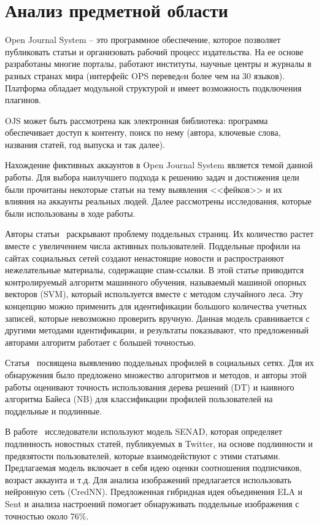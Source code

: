 \newpage
\section{Анализ предметной области}
\label{sec:Background}

Open Journal System – это программное обеспечение, которое позволяет публиковать статьи и организовать рабочий процесс издательства. На ее основе разработаны многие порталы, работают институты, научные центры и журналы в разных странах мира (интерфейс OPS переведeн более чем на 30 языков). Платформа обладает модульной структурой и имеет возможность подключения плагинов. 

OJS может быть рассмотрена как электронная библиотека: программа обеспечивает доступ к контенту, поиск по нему (автора, ключевые слова, названия статей, год выпуска и так далее). 

Нахождение фиктивных аккаунтов в Open Journal System является темой данной работы. Для выбора наилучшего подхода к решению задач и достижения цели были прочитаны некоторые статьи на тему выявления <<фейков>> и их влияния на аккаунты реальных людей. Далее рассмотрены исследования, которые были использованы в ходе работы.

Авторы статьи~\cite{HassanAA23} раскрывают проблему поддельных страниц. Их количество растет вместе с увеличением числа активных пользователей. Поддельные профили на сайтах социальных сетей создают ненастоящие новости и распространяют нежелательные материалы, содержащие спам-ссылки. В этой статье приводится контролируемый алгоритм машинного обучения, называемый машиной опорных векторов (SVM), который используется вместе с методом случайного леса. Эту концепцию можно применить для идентификации большого количества учетных записей, которые невозможно проверить вручную. Данная модель сравнивается с другими методами идентификации, и результаты показывают, что предложенный авторами алгоритм работает с большей точностью. 

Статья~\cite{ElyusufiEK19} посвящена выявлению поддельных профилей в социальных сетях. Для их обнаружения было предложено множество алгоритмов и методов, и авторы этой работы оценивают точность использования дерева решений (DT) и наивного алгоритма Байеса (NB) для классификации профилей пользователей на поддельные и подлинные.

В работе~\cite{UppadaMVHS22} исследователи используют модель SENAD, которая определяет подлинность новостных статей, публикуемых в Twitter, на основе подлинности и предвзятости пользователей, которые взаимодействуют с этими статьями. Предлагаемая модель включает в себя идею оценки соотношения подписчиков, возраст аккаунта и т.д. Для анализа изображений предлагается использовать нейронную сеть (CredNN). Предложенная гибридная идея объединения ELA и Sent и анализа настроений помогает обнаруживать поддельные изображения с точностью около 76\%.
    
